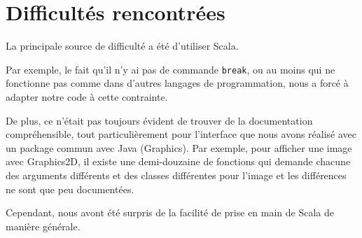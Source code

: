 \documentclass[10pt,a4paper]{article}
\begin{document}
\section{Difficultés rencontrées}

La principale source de difficulté a été d'utiliser Scala.

Par exemple, le fait qu'il n'y ai pas de commande \texttt{break}, ou au moins qui ne fonctionne pas comme dans d'autres langages de programmation, nous a forcé à adapter notre code à cette contrainte.

De plus, ce n'était pas toujours évident de trouver de la documentation compréhensible, tout particulièrement pour l'interface que nous avons réalisé avec un package commun avec Java (Graphics). Par exemple, pour afficher une image avec Graphics2D, il existe une demi-douzaine de fonctions qui demande chacune des arguments différents et des classes différentes pour l'image et les différences ne sont que peu documentées.

Cependant, nous avont été surpris de la facilité de prise en main de Scala de manière générale.
\end{document}
